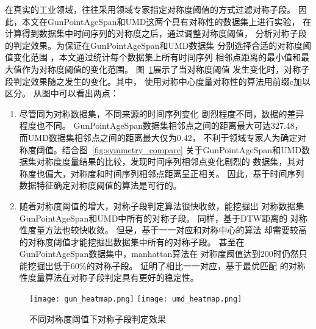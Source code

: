 在真实的工业领域，往往采用领域专家指定对称度阈值的方式过滤对称子段。
因此，本文在GunPointAgeSpan和UMD这两个具有对称性的数据集上进行实验，
在计算得到数据集中时间序列的对称度之后，通过调整对称度阈值，
分析对称子段的判定效果。为保证在GunPointAgeSpan和UMD数据集
分别选择合适的对称度阈值变化范围
，本文通过统计每个数据集上所有时间序列
相邻点距离的最小值和最大值作为对称度阈值的变化范围。
图~\ref{fig:symmetry_heatmap}展示了当对称度阈值
发生变化时，对称子段判定效果随之发生的变化。其中，
使用对称中心度量对称性的算法用前缀c加以区分。
从图中可以看出两点：
\begin{enumerate}
  \item 尽管同为对称数据集，不同来源的时间序列变化
        剧烈程度不同，数据的差异程度也不同。
        GunPointAgeSpan数据集相邻点之间的距离最大可达327.48，
        而UMD数据集相邻点之间的距离最大仅为0.42，
        不利于领域专家人为确定对称度阈值。结合图~\ref{fig:symmetry_compare}
        关于GunPointAgeSpan和UMD数据集对称度度量结果的比较，发现时间序列相邻点变化剧烈的
        数据集，其对称度也偏大，对称度和时间序列相邻点距离呈正相关。
        因此，基于时间序列
        数据特征确定对称度阈值的算法是可行的。
  \item 随着对称度阈值的增大，对称子段判定算法很快收敛，能挖掘出
        对称数据集GunPointAgeSpan和UMD中所有的对称子段。
        同样，基于DTW距离的
        对称性度量方法也较快收敛。
        但是，基于一一对应和对称中心的算法
        却需要较高
        的对称度阈值才能挖掘出数据集中所有的对称子段。
        甚至在GunPointAgeSpan数据集中，manhattan算法在
        对称度阈值达到200时仍然只能挖掘出低于60\%的对称子段。
        证明了相比一一对应，基于最优匹配
        的对称性度量算法在对称子段判定具有更好的稳定性。

\end{enumerate}
\begin{figure}
  \centering
  {\texttt{[image: gun\_heatmap.png]}}
  {\texttt{[image: umd\_heatmap.png]}}
  \caption{不同对称度阈值下对称子段判定效果}
  \label{fig:symmetry_heatmap}
\end{figure}

